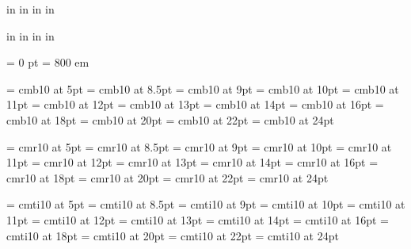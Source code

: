 

 in     %
 in    %
 in  %
 in  %

 in     %
 in    %
 in  %
 in  %

\nopagenumbers

\parindent = 0 pt
\emergencystretch = 800 em

\font\FFba=      cmb10           at 5pt
\font\FFbb=      cmb10           at 8.5pt
\font\FFbc=      cmb10           at  9pt
\font\FFbd=      cmb10           at 10pt
\font\FFbe=      cmb10           at 11pt
\font\FFbf=      cmb10           at 12pt
\font\FFbg=      cmb10           at 13pt
\font\FFbh=      cmb10           at 14pt
\font\FFbi=      cmb10           at 16pt
\font\FFbj=      cmb10           at 18pt
\font\FFbk=      cmb10           at 20pt
\font\FFbl=      cmb10           at 22pt
\font\FFbm=      cmb10           at 24pt

\font\FFra=      cmr10           at 5pt
\font\FFrb=      cmr10           at 8.5pt
\font\FFrc=      cmr10           at  9pt
\font\FFrd=      cmr10           at 10pt
\font\FFre=      cmr10           at 11pt
\font\FFrf=      cmr10           at 12pt
\font\FFrg=      cmr10           at 13pt
\font\FFrh=      cmr10           at 14pt
\font\FFri=      cmr10           at 16pt
\font\FFrj=      cmr10           at 18pt
\font\FFrk=      cmr10           at 20pt
\font\FFrl=      cmr10           at 22pt
\font\FFrm=      cmr10           at 24pt

\font\FFta=      cmti10           at 5pt
\font\FFtb=      cmti10           at 8.5pt
\font\FFtc=      cmti10           at  9pt
\font\FFtd=      cmti10           at 10pt
\font\FFte=      cmti10           at 11pt
\font\FFtf=      cmti10           at 12pt
\font\FFtg=      cmti10           at 13pt
\font\FFth=      cmti10           at 14pt
\font\FFti=      cmti10           at 16pt
\font\FFtj=      cmti10           at 18pt
\font\FFtk=      cmti10           at 20pt
\font\FFtl=      cmti10           at 22pt
\font\FFtm=      cmti10           at 24pt


\def\filltospace#1#2{{%
  \dimen0=#1\relax
  \dimen0=.5\dimen0
  \vrule height -3pt depth 3.4pt width \dimen0
  \raise1pt\hbox to 0pt{\hss#2\hss}%
  \vrule height -3pt depth 3.4pt width \dimen0
}}

